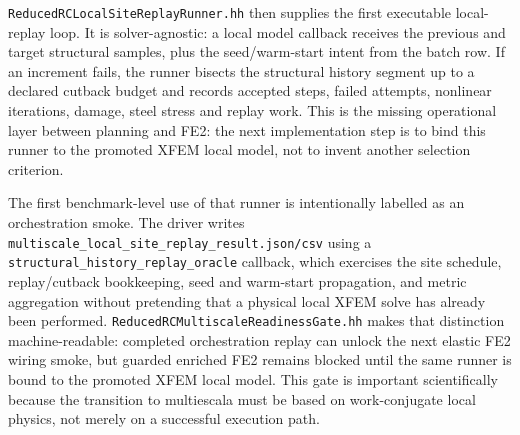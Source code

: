 \texttt{ReducedRCLocalSiteReplayRunner.hh} then supplies the first executable
local-replay loop.  It is solver-agnostic: a local model callback receives the
previous and target structural samples, plus the seed/warm-start intent from
the batch row.  If an increment fails, the runner bisects the structural
history segment up to a declared cutback budget and records accepted steps,
failed attempts, nonlinear iterations, damage, steel stress and replay work.
This is the missing operational layer between planning and FE2: the next
implementation step is to bind this runner to the promoted XFEM local model,
not to invent another selection criterion.

The first benchmark-level use of that runner is intentionally labelled as an
orchestration smoke.  The driver writes
\texttt{multiscale\_local\_site\_replay\_result.json/csv} using a
\texttt{structural\_history\_replay\_oracle} callback, which exercises the
site schedule, replay/cutback bookkeeping, seed and warm-start propagation, and
metric aggregation without pretending that a physical local XFEM solve has
already been performed.  \texttt{ReducedRCMultiscaleReadinessGate.hh} makes
that distinction machine-readable: completed orchestration replay can unlock
the next elastic FE2 wiring smoke, but guarded enriched FE2 remains blocked
until the same runner is bound to the promoted XFEM local model.  This gate is
important scientifically because the transition to multiescala must be based
on work-conjugate local physics, not merely on a successful execution path.

